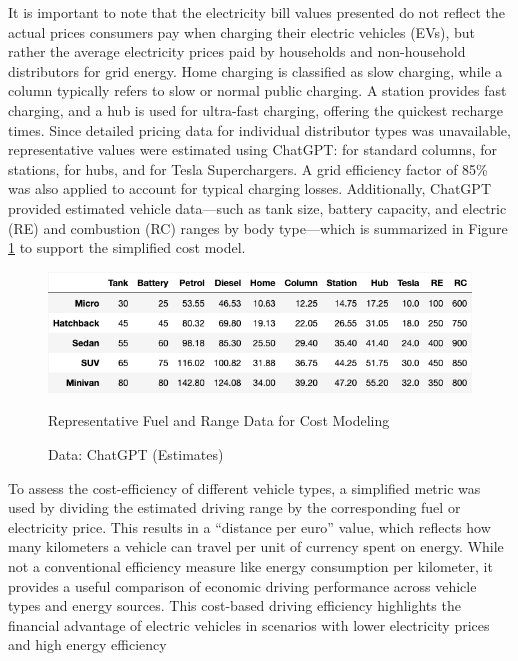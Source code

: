 It is important to note that the electricity bill values presented do not reflect the actual prices consumers pay when charging their electric vehicles (EVs), but rather the average electricity prices paid by households and non-household distributors for grid energy. Home charging is classified as slow charging, while a column typically refers to slow or normal public charging. A station provides fast charging, and a hub is used for ultra-fast charging, offering the quickest recharge times. Since detailed pricing data for individual distributor types was unavailable, representative values were estimated using ChatGPT:  for standard columns,  for stations,  for hubs, and  for Tesla Superchargers. A grid efficiency factor of 85\% was also applied to account for typical charging losses. Additionally, ChatGPT provided estimated vehicle data—such as tank size, battery capacity, and electric (RE) and combustion (RC) ranges by body type—which is summarized in Figure \ref{fig: vehic_data} to support the simplified cost model.
\begin{figure}[H]
	\begin{center}
		\includegraphics[width=\linewidth]{images/Prices_summary.png}
		\caption{Representative Fuel and Range Data for Cost Modeling}
		\label{fig: vehic_data}
		\caption*{Data: ChatGPT (Estimates)}
	\end{center}	
\end{figure}
To assess the cost-efficiency of different vehicle types, a simplified metric was used by dividing the estimated driving range by the corresponding fuel or electricity price. This results in a “distance per euro” value, which reflects how many kilometers a vehicle can travel per unit of currency spent on energy.  While not a conventional efficiency measure like energy consumption per kilometer, it provides a useful comparison of economic driving performance across vehicle types and energy sources. This cost-based driving efficiency highlights the financial advantage of electric vehicles in scenarios with lower electricity prices and high energy efficiency
